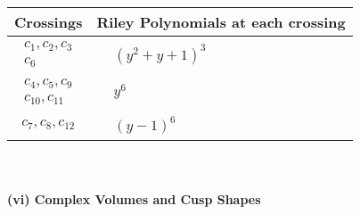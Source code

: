\documentclass[1p]{elsarticle_modified}
\theoremstyle{definition}
\begin{document}
\begin{tabular}{m{50pt}|m{274pt}}
Crossings & \hspace{64pt}Riley Polynomials at each crossing \\
\hline $$\begin{aligned}c_{1},c_{2},c_{3}\\c_{6}\end{aligned}$$&$\begin{aligned}
&(y^2+y+1)^3
\end{aligned}$\\
\hline $$\begin{aligned}c_{4},c_{5},c_{9}\\c_{10},c_{11}\end{aligned}$$&$\begin{aligned}
&y^6
\end{aligned}$\\
\hline $$\begin{aligned}c_{7},c_{8},c_{12}\end{aligned}$$&$\begin{aligned}
&(y-1)^6
\end{aligned}$\\
\hline
\end{tabular}\\~\\
\newpage\flushleft \textbf{(vi) Complex Volumes and Cusp Shapes}
\end{document}
